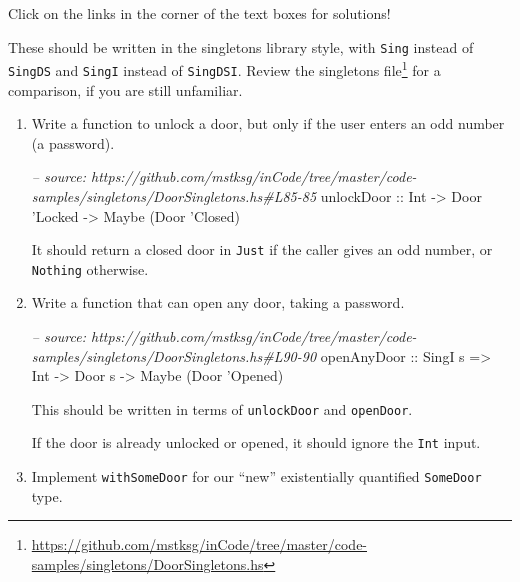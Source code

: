 \documentclass[]{article}
\newenvironment{Shaded}{}{}
\newcommand{\DataTypeTok}[1]{\textcolor[rgb]{0.56,0.13,0.00}{#1}}
\newcommand{\CharTok}[1]{\textcolor[rgb]{0.25,0.44,0.63}{#1}}
\newcommand{\CommentTok}[1]{\textcolor[rgb]{0.38,0.63,0.69}{\textit{#1}}}
\newcommand{\OtherTok}[1]{\textcolor[rgb]{0.00,0.44,0.13}{#1}}
\newcommand{\NormalTok}[1]{#1}
\renewcommand{\href}[2]{#2\footnote{\url{#1}}}
\begin{document}
Click on the links in the corner of the text boxes for solutions!

These should be written in the singletons library style, with \texttt{Sing}
instead of \texttt{SingDS} and \texttt{SingI} instead of \texttt{SingDSI}.
Review the
\href{https://github.com/mstksg/inCode/tree/master/code-samples/singletons/DoorSingletons.hs}{singletons
file} for a comparison, if you are still unfamiliar.

\begin{enumerate}
\def\labelenumi{\arabic{enumi}.}
\item
  Write a function to unlock a door, but only if the user enters an odd number
  (a password).

\begin{Shaded}
\begin{Highlighting}[]
\CommentTok{-- source: https://github.com/mstksg/inCode/tree/master/code-samples/singletons/DoorSingletons.hs#L85-85}
\OtherTok{unlockDoor ::} \DataTypeTok{Int} \OtherTok{->} \DataTypeTok{Door} \CharTok{'Locked -> Maybe (Door '}\DataTypeTok{Closed}\NormalTok{)}
\end{Highlighting}
\end{Shaded}

  It should return a closed door in \texttt{Just} if the caller gives an odd
  number, or \texttt{Nothing} otherwise.
\item
  Write a function that can open any door, taking a password.

\begin{Shaded}
\begin{Highlighting}[]
\CommentTok{-- source: https://github.com/mstksg/inCode/tree/master/code-samples/singletons/DoorSingletons.hs#L90-90}
\OtherTok{openAnyDoor ::} \DataTypeTok{SingI}\NormalTok{ s }\OtherTok{=>} \DataTypeTok{Int} \OtherTok{->} \DataTypeTok{Door}\NormalTok{ s }\OtherTok{->} \DataTypeTok{Maybe}\NormalTok{ (}\DataTypeTok{Door} \CharTok{'Opened)}
\end{Highlighting}
\end{Shaded}

  This should be written in terms of \texttt{unlockDoor} and \texttt{openDoor}.

  If the door is already unlocked or opened, it should ignore the \texttt{Int}
  input.
\item
  Implement \texttt{withSomeDoor} for our ``new'' existentially quantified
  \texttt{SomeDoor} type.


\end{enumerate}
\end{document}
